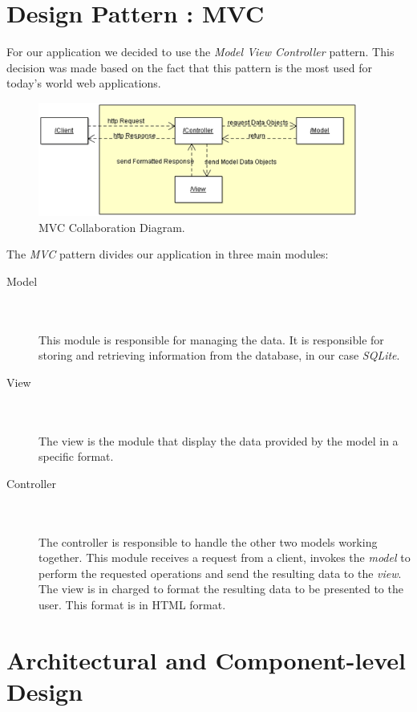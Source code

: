 \documentclass[a4paper,12pt,oneside]{report}
\begin{document}
\chapter{Design Pattern : MVC}
For our application we decided to use the \emph{Model View Controller} pattern. This decision was made based on the fact that this pattern is the most used for today's world web applications.
\vskip 1cm
\begin{figure}[h!]
  \begin{center}
   \includegraphics[width=10.5cm]{pics/mvc1.png}
  \end{center}
\caption{MVC Collaboration Diagram.}
\end{figure}

\vskip 1.5cm
The \emph{MVC} pattern divides our application in three main modules:\\
\begin{description}
\item[Model]   \\ \\
This module is responsible for managing the data. It is responsible for storing and retrieving information from the database, in our case \emph{SQLite}. \\
\item[View]   \\ \\
The view is the module that display the data provided by the model in a specific format. \\
\item[Controller]    \\ \\
The controller is responsible to handle the other two models working together. This module receives a request from a client, invokes the \emph{model} to perform the requested operations and send the resulting data to the \emph{view}. The view is in charged to  format the resulting data to be presented to the user. This format is in HTML format.
\end{description}

\chapter{ Architectural and Component-level Design}
\end{document}
